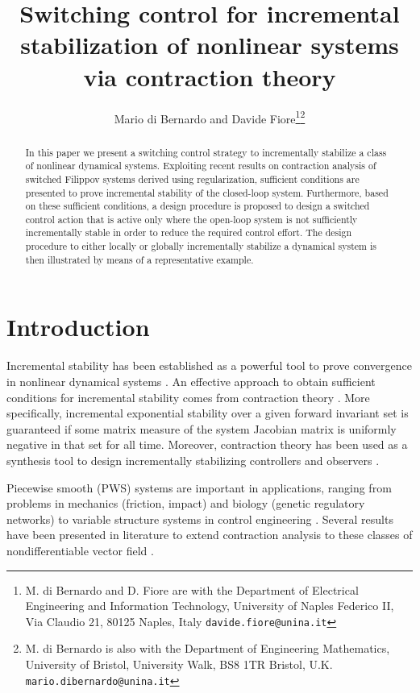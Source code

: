 \documentclass[letterpaper, 10 pt, conference]{ieeeconf}
\title{\LARGE \bf
Switching control for incremental stabilization of nonlinear systems via contraction theory
}
\author{Mario di Bernardo and Davide Fiore\thanks{M. di Bernardo and D. Fiore are with the Department of Electrical Engineering and Information Technology, University of Naples Federico II, Via Claudio 21, 80125 Naples, Italy
        {\tt\small davide.fiore@unina.it}}\thanks{M. di Bernardo is also with the Department of Engineering Mathematics, University of Bristol, University Walk, BS8 1TR Bristol, U.K.
        {\tt\small mario.dibernardo@unina.it}}}
\begin{document}
\maketitle
\thispagestyle{empty}
\pagestyle{empty}


\begin{abstract}
In this paper we present a switching control strategy to incrementally stabilize a class of nonlinear dynamical systems. Exploiting recent results on contraction analysis of switched Filippov systems derived using regularization, sufficient conditions are presented to prove incremental stability of the closed-loop system. Furthermore, based on these sufficient conditions, a design procedure is proposed to design a switched control action that is active only where the open-loop system is not sufficiently incrementally stable in order to reduce the required control effort. The design procedure to either locally or globally incrementally stabilize a dynamical system is then illustrated by means of a representative example.
\end{abstract}


\section{Introduction}
Incremental stability has been established as a powerful tool to prove convergence in nonlinear dynamical systems \cite{angeli2002lyapunov}. An effective approach to obtain sufficient conditions for incremental stability comes from contraction theory \cite{lohmiller1998contraction,russo2010global,jouffroy2005some, forni2014differential,aminzare2014contraction}. More specifically, incremental exponential stability over a given forward invariant set is guaranteed if some matrix measure  of the system Jacobian matrix is uniformly negative in that set for all time. Moreover, contraction theory has been used as a synthesis tool to design incrementally stabilizing controllers and observers \cite{lohmiller1998contraction,manchester2014control,manchester2014output,van2008tracking}.

Piecewise smooth (PWS) systems are important in applications, ranging from problems in mechanics (friction, impact) and biology (genetic regulatory networks) to variable structure systems in control engineering \cite{filippov1988differential,cortes2008discontinuous,bernardo2008piecewise,utkin2013sliding}. Several results have been presented in literature to extend contraction analysis to these classes of nondifferentiable vector field \cite{lohmiller2000nonlinear,pavlov2005convergentp1,pavlov2005convergentp2,di2014contraction,lu2015contraction,di2013incremental,di2014incremental,fiore2015contraction}.
\end{document}
